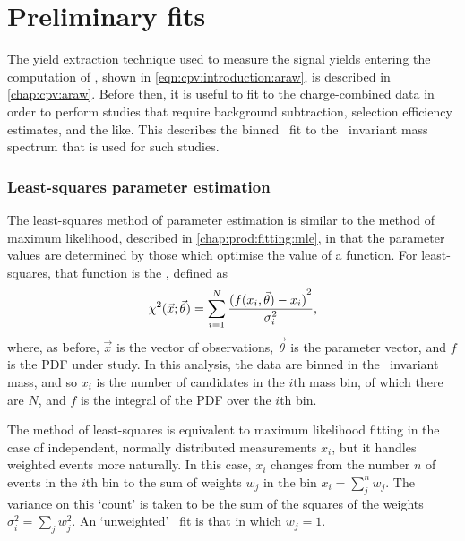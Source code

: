 \chapter{Preliminary fits}
\label{chap:cpv:prelim_fits}

The yield extraction technique used to measure the signal yields entering the 
computation of \ARaw, shown in \cref{eqn:cpv:introduction:araw}, is described 
in \cref{chap:cpv:araw}.
Before then, it is useful to fit to the charge-combined data in order to 
perform studies that require background subtraction, selection efficiency 
estimates, and the like.
This  describes the binned \chisq\ fit to the 
\phh\ invariant mass spectrum that is used for such studies.

\subsection{Least-squares parameter estimation}
\label{chap:cpv:prelim_fits:least_squares}

The least-squares method of parameter estimation is similar to the method of 
maximum likelihood, described in \cref{chap:prod:fitting:mle}, in that the 
parameter values are determined by those which optimise the value of a 
function.
For least-squares, that function is the \chisq, defined as
\begin{equation}
  \chisq(\vec{x}; \vec{\theta}) = \sum_{i = 1}^{N} \frac{%
    {(f(x_{i}, \vec{\theta}) - x_{i})}^{2}
  }{%
    \sigma_{i}^{2}
  },
\end{equation}
where, as before, $\vec{x}$ is the vector of observations, $\vec{\theta}$ is 
the parameter vector, and $f$ is the \ac{PDF} under study.
In this analysis, the data are binned in the \phh\ invariant mass, and so 
$x_{i}$ is the number of candidates in the $i$th mass bin, of which there are 
$N$, and $f$ is the integral of the \ac{PDF} over the $i$th bin.\footnotemark


The method of least-squares is equivalent to maximum likelihood fitting in the 
case of independent, normally distributed measurements $x_{i}$, but it handles 
weighted events more naturally.
In this case, $x_{i}$ changes from the number $n$ of events in the $i$th bin to 
the sum of weights $w_{j}$ in the bin $x_{i} = \sum_{j}^{n} w_{j}$.
The variance on this `count' is taken to be the sum of the squares of the 
weights $\sigma_{i}^{2} = \sum_{j} w_{j}^{2}$.
An `unweighted' \chisq\ fit is that in which $w_{j} = 1$.

